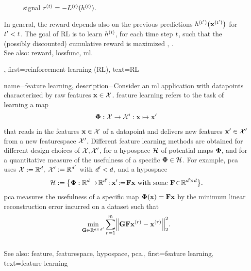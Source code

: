 {{\begin{figure}[H]
\begin{center}
{		signal $r^{(t)}=-L^{(t)}(h^{(t)})$. \label{fig_reinforcementlearning_dict}}
		\end{center}
		\end{figure}
		In general, the \gls{reward} depends also on the 
		previous \glspl{prediction} $h^{(t')}\big({\bf x}^{(t')}\big)$ 
		for $t' < t$. The goal of RL is to learn $h^{(t)}$, for 
		each time step $t$, such that the (possibly discounted) cumulative \gls{reward} 
		is maximized \cite{MLBasics}, \cite{SuttonEd2}.
		\\
		See also: \gls{reward}, \gls{lossfunc}, \gls{ml}.},
	first={reinforcement learning (RL)},
	text={RL}
}


{name={feature learning},
	description={Consider an \gls{ml} application with \glspl{datapoint} characterized by 
		raw \glspl{feature} ${\bf x} \in \mathcal{X}$. \Gls{feature} learning 
		refers to the task of learning a \gls{map} 
		$${\bf \Phi}: \mathcal{X} \rightarrow \mathcal{X}': {\bf x} \mapsto {\bf x}'$$ 
		that reads in the \glspl{feature} ${\bf x} \in \mathcal{X}$ of a \gls{datapoint} and delivers new 
		\glspl{feature} ${\bf x}' \in \mathcal{X}'$ from a new \gls{featurespace} $\mathcal{X}'$. 
		Different \gls{feature} learning methods are obtained for different design 
		choices of $\mathcal{X},\mathcal{X}'$, for a \gls{hypospace} $\mathcal{H}$ 
		of potential \glspl{map} ${\bf \Phi}$, and for a quantitative measure of the usefulness of 
		a specific ${\bf \Phi} \in \mathcal{H}$. For example, \gls{pca} 
		uses $\mathcal{X} := \mathbb{R}^{d}$, $\mathcal{X}' := \mathbb{R}^{d'}$ 
		with $d' < d$, and a \gls{hypospace} 
		$$\hypospace\defeq \big\{ \featuremapvec: \mathbb{R}^{\dimlocalmodel}
		\!\rightarrow\! \mathbb{R}^{\dimlocalmodel'}\!:\!\featurevec'\!\defeq\!\mF \featurevec \mbox{ with some } \mF \!\in\! \mathbb{R}^{\dimlocalmodel' \!\times \dimlocalmodel} \big\}.$$ \Gls{pca} measures the usefulness of a specific \gls{map} ${\bf \Phi}({\bf x})= \mathbf{F} {\bf x}$ 
	by the \gls{minimum} linear reconstruction error incurred on a \gls{dataset} such that 
$$\min_{\mG \in \mathbb{R}^{\dimlocalmodel \!\!\!\times \dimlocalmodel'}} \sum_{\sampleidx=1}^{\samplesize} \normgeneric{\mG \mF \featurevec^{(\sampleidx)} - \featurevec^{(\sampleidx)}}{2}^{2}.$$ 
			\\ 
		See also: \gls{feature}, \gls{featurespace}, \gls{hypospace}, \gls{pca}.}, 
	first={feature learning},
	text={feature learning}
} 

